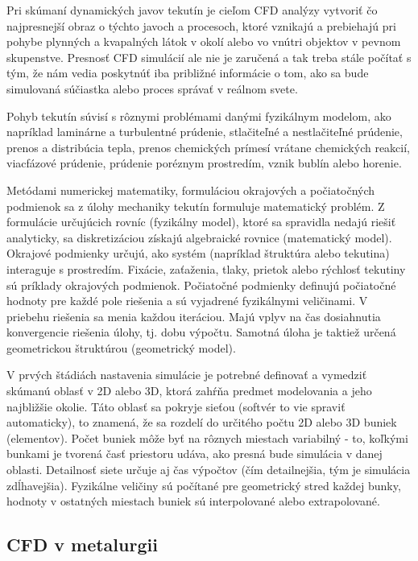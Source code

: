 \documentclass[]{tukediphc}
\begin{document}
Pri skúmaní dynamických javov tekutín je cieľom CFD analýzy vytvoriť čo najpresnejší obraz o týchto javoch a procesoch, ktoré vznikajú a prebiehajú pri pohybe plynných a kvapalných látok v okolí alebo vo vnútri objektov v pevnom skupenstve. Presnosť CFD simulácií ale nie je zaručená a tak treba stále počítať s tým, že nám vedia poskytnúť iba približné informácie o tom, ako sa bude simulovaná súčiastka alebo proces správať v reálnom svete. 

Pohyb tekutín súvisí s rôznymi problémami danými fyzikálnym modelom, ako napríklad laminárne a turbulentné prúdenie, stlačiteľné a nestlačiteľné prúdenie, prenos a distribúcia tepla, prenos chemických prímesí vrátane chemických reakcií, viacfázové prúdenie, prúdenie poréznym prostredím, vznik bublín alebo horenie.

Metódami numerickej matematiky, formuláciou okrajových a počiatočných podmienok sa z úlohy mechaniky tekutín formuluje matematický problém. Z formulácie určujúcich rovníc (fyzikálny model), ktoré sa spravidla nedajú riešiť analyticky, sa diskretizáciou získajú algebraické rovnice (matematický model). Okrajové podmienky určujú, ako systém (napríklad štruktúra alebo tekutina) interaguje s prostredím. Fixácie, zaťaženia, tlaky, prietok alebo rýchlosť tekutiny sú príklady okrajových podmienok. Počiatočné podmienky definujú počiatočné hodnoty pre každé pole riešenia a sú vyjadrené fyzikálnymi veličinami. V priebehu riešenia sa menia každou iteráciou. Majú vplyv na čas dosiahnutia konvergencie riešenia úlohy, tj. dobu výpočtu. Samotná úloha je taktiež určená geometrickou štruktúrou (geometrický model).

V prvých štádiách nastavenia simulácie je potrebné definovať a vymedziť skúmanú oblasť v 2D alebo 3D, ktorá zahŕňa predmet modelovania a jeho najbližšie okolie. Táto oblasť sa pokryje sieťou (softvér to vie spraviť automaticky), to znamená, že sa rozdelí do určitého počtu 2D alebo 3D buniek (elementov). Počet buniek môže byť na rôznych miestach variabilný - to, koľkými bunkami je tvorená časť priestoru udáva, ako presná bude simulácia v danej oblasti. Detailnosť siete určuje aj čas výpočtov (čím detailnejšia, tým je simulácia zdĺhavejšia). Fyzikálne veličiny sú počítané pre geometrický stred každej bunky, hodnoty v ostatných miestach buniek sú interpolované alebo extrapolované.

\subsection{CFD v metalurgii}
\end{document}
